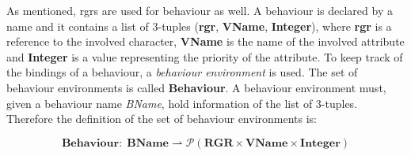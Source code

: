 As mentioned, \ac{rgrs} are used for behaviour as well. A behaviour is declared by a name and it contains a list of 3-tuples (\textbf{\ac{rgr}}, \textbf{VName}, \textbf{Integer}), where \textbf{\ac{rgr}} is a reference to the involved character, \textbf{VName} is the name of the involved attribute and \textbf{Integer} is a value representing the priority of the attribute. To keep track of the bindings of a behaviour, a \textit{behaviour environment} is used. The set of behaviour environments is called \textbf{Behaviour}.
A behaviour environment must, given a behaviour name \textit{BName}, hold information of the list of 3-tuples. Therefore the definition of the set of behaviour environments is:

$$\mathbf{Behaviour: \; BName \rightharpoonup \mathcal{P}(RGR \times VName \times Integer)}$$
\begin{comment}
The transition system for declaration of behaviour is

\begin{tabular}{l l}
$\Gamma_{DecB} = $ & $\mathbf{Character \times Ability \times Behaviour \times Event \times}$ \\
 & $\mathbf{\times Name \times Type \times Stm}$ \\ %
$\Rightarrow_{DecB}$ & \\
$T_{DecB} = $ & $\mathbf{Character \times Ability \times Behaviour \times Event}$ \\
\end{tabular}
\\\\
$\Rightarrow_{DecB}$ is defined by the rules in table \ref{tbl:decB}.\\\\
\end{comment}
\\\\
